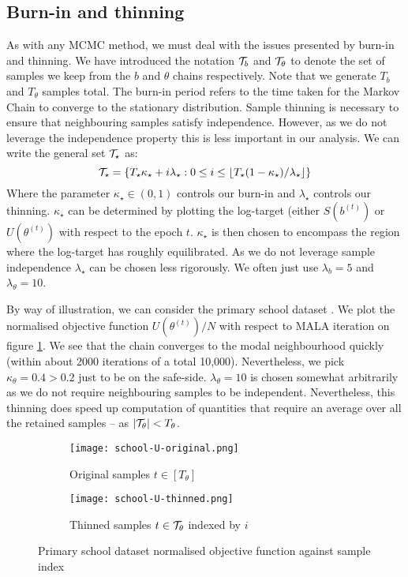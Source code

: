 \FloatBarrier
\subsection{Burn-in and thinning}
\label{appdx:burn-in-thinning}

As with any MCMC method, we must deal with the issues presented by burn-in and thinning. We have introduced the notation $\mathcal{T}_b$ and $\mathcal{T}_\theta$ to denote the set of samples we keep from the $b$ and $\theta$ chains respectively. Note that we generate $T_b$ and $T_\theta$ samples total. The burn-in period refers to the time taken for the Markov Chain to converge to the stationary distribution. Sample thinning is necessary to ensure that neighbouring samples satisfy independence. However, as we do not leverage the independence property this is less important in our analysis. We can write the general set $\mathcal{T}_\star$ as:
%
\begin{equation}
	\mathcal{T}_\star = \{T_\star \kappa_\star + i \lambda_\star :  
	0 \leq i \leq \lfloor T_\star(1 - \kappa_\star) / \lambda_\star \rfloor \}
\end{equation}
%
Where the parameter $\kappa_\star \in (0, 1)$ controls our burn-in and $\lambda_\star$ controls our thinning. $\kappa_\star$ can be determined by plotting the log-target (either $S(b^{(t)})$ or $U(\theta^{(t)})$ with respect to the epoch $t$. $\kappa_\star$ is then chosen to encompass the region where the log-target has roughly equilibrated. As we do not leverage sample independence $\lambda_\star$ can be chosen less rigorously. We often just use $\lambda_b=5$ and $\lambda_\theta = 10$.

By way of illustration, we can consider the primary school dataset \cite{schools}. We plot the normalised objective function $U\left( \theta^{(t)} \right) / N$ with respect to MALA iteration on figure \ref{fig:school-U-orginal}. We see that the chain converges to the modal neighbourhood quickly (within about 2000 iterations of a total 10,000). Nevertheless, we pick $\kappa_\theta=0.4 > 0.2$ just to be on the safe-side. $\lambda_\theta=10$ is chosen somewhat arbitrarily as we do not require neighbouring samples to be independent. Nevertheless, this thinning does speed up computation of quantities that require an average over all the retained samples -- as $|\mathcal{T}_\theta| < T_\theta$.
%
\begin{figure}[!h]
	\centering
	\begin{subfigure}[t]{0.4\linewidth}
		\centering
		\texttt{[image: school-U-original.png]}
		\caption{Original samples $t \in [T_\theta]$}
		\label{fig:school-U-orginal}
	\end{subfigure}
	\begin{subfigure}[t]{0.4\linewidth}
		\centering
		\texttt{[image: school-U-thinned.png]}
		\caption{Thinned samples $t \in \mathcal{T}_\theta$ indexed by $i$}
		\label{fig:school-U-thinned}
	\end{subfigure}
	\hspace{1cm}
	\caption{Primary school dataset normalised objective function against sample index}
\end{figure}

